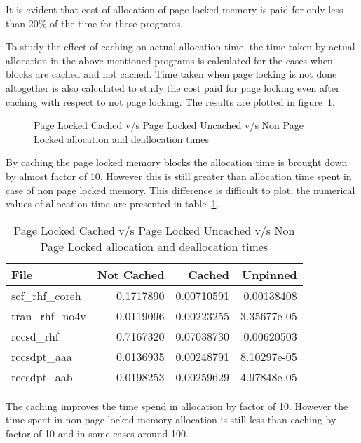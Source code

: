 It is evident that cost of allocation of page locked memory is
paid for only less than 20\% of the time for these programs.

To study the effect of caching on actual allocation time, the time taken by actual
allocation in the above mentioned programs is calculated for the cases when blocks
are cached and not cached. Time taken when page locking is not done altogether is
also calculated to study the cost paid for page locking even after caching with
respect to not page locking. The results are plotted in figure~\ref{fig:mempin_caching}.

\begin{figure}[h]
  
  \caption{Page Locked Cached v/s Page Locked Uncached v/s Non Page Locked allocation
  and deallocation times}
  \label{fig:mempin_caching}
\end{figure}

By caching the page locked memory blocks the allocation time is brought down by
almost factor of 10. However this is still greater than allocation time spent in
case of non page locked memory. This difference is difficult to plot, the numerical
values of allocation time are presented in table~\ref{tab:mempin_caching}.

\begin{table}[h]
  \centering
  \begin{tabular}{l | r | r | r}
    \hline
    File            & Not Cached & Cached     & Unpinned    \\
    \hline
    scf\_rhf\_coreh & 0.1717890  & 0.00710591 & 0.00138408  \\
    tran\_rhf\_no4v & 0.0119096  & 0.00223255 & 3.35677e-05 \\
    rccsd\_rhf      & 0.7167320  & 0.07038730 & 0.00620503  \\
    rccsdpt\_aaa    & 0.0136935  & 0.00248791 & 8.10297e-05 \\
    rccsdpt\_aab    & 0.0198253  & 0.00259629 & 4.97848e-05 \\
    \hline
  \end{tabular}
  \caption{Page Locked Cached v/s Page Locked Uncached v/s Non Page Locked allocation
  and deallocation times}
  \label{tab:mempin_caching}
\end{table}

The caching improves the time spend in allocation by factor of 10. However the time
spent in non page locked memory allocation is still less than caching by factor
of 10 and in some cases around 100.